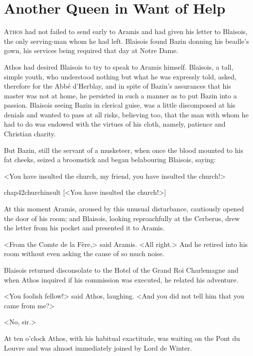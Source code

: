 \chapter{Another Queen in Want of Help}

 \lettrine{A}{thos} had not failed to send early to Aramis and had given his letter to Blaisois, the only serving-man whom he had left. Blaisois found Bazin donning his beadle's gown, his services being required that day at Notre Dame.

\zz
Athos had desired Blaisois to try to speak to Aramis himself. Blaisois, a tall, simple youth, who understood nothing but what he was expressly told, asked, therefore for the Abbé d'Herblay, and in spite of Bazin's assurances that his master was not at home, he persisted in such a manner as to put Bazin into a passion. Blaisois seeing Bazin in clerical guise, was a little discomposed at his denials and wanted to pass at all risks, believing too, that the man with whom he had to do was endowed with the virtues of his cloth, namely, patience and Christian charity.

But Bazin, still the servant of a musketeer, when once the blood mounted to his fat cheeks, seized a broomstick and began belabouring Blaisois, saying:

<You have insulted the church, my friend, you have insulted the church!>

\begin{bwbigpic}
	[\basicscale] 
	{chap42churchinsult}
	[<You have insulted the church!>]
\end{bwbigpic}

At this moment Aramis, aroused by this unusual disturbance, cautiously opened the door of his room; and Blaisois, looking reproachfully at the Cerberus, drew the letter from his pocket and presented it to Aramis.

<From the Comte de la Fère,> said Aramis. <All right.> And he retired into his room without even asking the cause of so much noise.

Blaisois returned disconsolate to the Hotel of the Grand Roi Charlemagne and when Athos inquired if his commission was executed, he related his adventure.

<You foolish fellow!> said Athos, laughing. <And you did not tell him that you came from me?>

<No, sir.>

At ten o'clock Athos, with his habitual exactitude, was waiting on the Pont du Louvre and was almost immediately joined by Lord de Winter.

